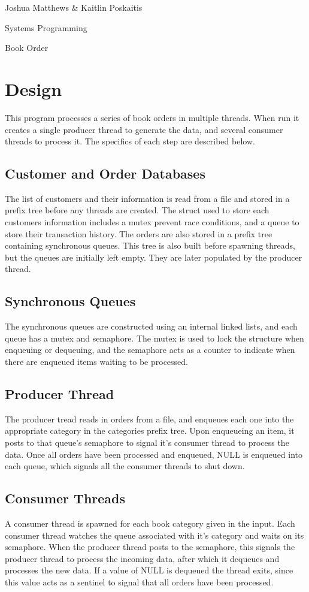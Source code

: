 \documentclass[letterpaper,12pt]{article}
\begin{document}
\noindent Joshua Matthews \& Kaitlin Poskaitis

\noindent Systems Programming

\noindent Book Order

\section{Design}
This program processes a series of book orders in multiple threads. When run it
creates a single producer thread to generate the data, and several consumer
threads to process it. The specifics of each step are described below.

\subsection{Customer and Order Databases}
The list of customers and their information is read from a file and stored in a
prefix tree before any threads are created. The struct used to store each
customers information includes a mutex prevent race conditions, and a queue to
store their transaction history. The orders are also stored in a prefix tree
containing synchronous queues. This tree is also built before spawning threads,
but the queues are initially left empty. They are later populated by the
producer thread.

\subsection{Synchronous Queues}
The synchronous queues are constructed using an internal linked lists, and each
queue has a mutex and semaphore. The mutex is used to lock the structure when
enqueuing or dequeuing, and the semaphore acts as a counter to indicate when
there are enqueued items waiting to be processed.

\subsection{Producer Thread}
The producer tread reads in orders from a file, and enqueues each one into the
appropriate category in the categories prefix tree. Upon enqueueing an item, it
posts to that queue's semaphore to signal it's consumer thread to process the
data. Once all orders have been processed and enqueued, NULL is enqueued into
each queue, which signals all the consumer threads to shut down.

\subsection{Consumer Threads}
A consumer thread is spawned for each book category given in the input. Each
consumer thread watches the queue associated with it's category and waits on
its semaphore. When the producer thread posts to the semaphore, this signals
the producer thread to process the incoming data, after which it dequeues and
processes the new data. If a value of NULL is dequeued the thread exits, since
this value acts as a sentinel to signal that all orders have been processed.
\end{document}
